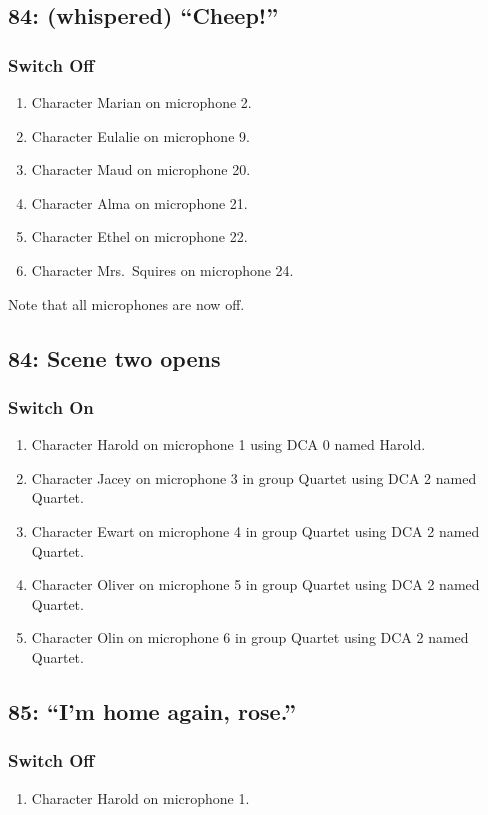 \subsection* {84: (whispered) ``Cheep!''}
\subsubsection* {Switch Off}
\begin{enumerate}
\item Character Marian on microphone 2.
\item Character Eulalie on microphone 9.
\item Character Maud on microphone 20.
\item Character Alma on microphone 21.
\item Character Ethel on microphone 22.
\item Character Mrs.~Squires on microphone 24.
\end{enumerate}
Note that all microphones are now off.
\subsection* {84: Scene two opens}
\subsubsection* {Switch On}
\begin{enumerate}
\item Character Harold on microphone 1 using DCA 0 named Harold.
\item Character Jacey on microphone 3 in group Quartet using DCA 2 named Quartet.
\item Character Ewart on microphone 4 in group Quartet using DCA 2 named Quartet.
\item Character Oliver on microphone 5 in group Quartet using DCA 2 named Quartet.
\item Character Olin on microphone 6 in group Quartet using DCA 2 named Quartet.
\end{enumerate}
\subsection* {85: ``I'm home again, rose.''}
\subsubsection* {Switch Off}
\begin{enumerate}
\item Character Harold on microphone 1.
\end{enumerate}
